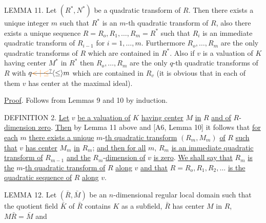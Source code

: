 LEMMA 11. Let $(R^*,N^*)$ be a quadratic transform of $R$. Then there exists a unique integer $m$ such that $R^*$ is an $m$-th quadratic transform of $R$, also there exists a unique sequence $R=R_o,R_1,\ldots,R_m=R^*$ such that $R_i$ is an immediate quadratic transform of $R_{i-1}$ for $i=1,\ldots,m$. Furthermore $R_o,\ldots,R_m$ are the only quadratic transforms of $R$ which are contained in $R^*$. Also if $v$ is a valuation of $K$ having center $M^*$ in $R^*$ then $R_o,\ldots,R_m$ are the only $q$-th quadratic transforms of $R$ with $q\deleted{\unsure{<|\leq}}\handwritten{\inserted{\leq}}m$ which are contained in $R_v$ (it is obvious that in each of them $v$ has center at the maximal ideal).

\uline{Proof}. Follows from Lemmas 9 and 10 by induction.

DEFINITION 2. \uline{Let} $v$ \uline{be a valuation of} $K$ \uline{having center} $M$ \uline{in} $R$ \uline{and of} $R$-\uline{dimension zero}. \uline{Then} by Lemma 11 above and [A6, Lemma 10] it follows that \uline{for each} $m$ \uline{there exists a unique} $m$-\uline{th quadratic transform} $(R_m,M_m)$ \uline{of} $R$ \uline{such that} $v$ \uline{has center} $M_m$ \uline{in} $R_m$; \uline{and then for all} $m$, $R_m$ \uline{is an immediate quadratic transform of} $R_{m-1}$ \uline{and the} $R_m$-\uline{dimension of} $v$ \uline{is zero}. \uline{We shall say that} $R_m$ \uline{is the} $m$-\uline{th quadratic transform of} $R$ \uline{along} $v$ \uline{and that} $R=R_o,R_1,R_2,\ldots$ \uline{is the quadratic sequence of} $R$ \uline{along} $v$.

LEMMA 12. Let\unsure{,} $(\bar R,\bar M)$ be an $n$-dimensional regular local domain such that the quotient field $\bar K$ of $\bar R$ contains $K$ as a subfield, $\bar R$ has center $M$ in $R$, $M\bar R=\bar M$ and
